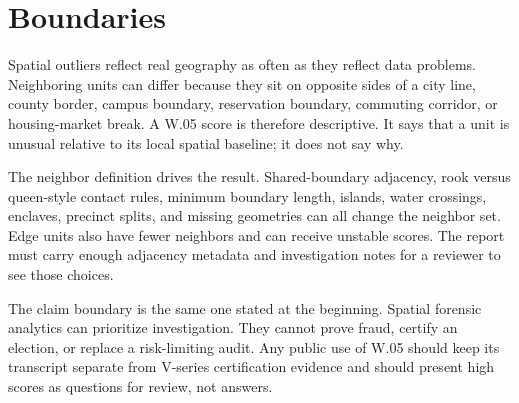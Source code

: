 \section{Boundaries}

Spatial outliers reflect real geography as often as they reflect data problems.
Neighboring units can differ because they sit on opposite sides of a city line,
county border, campus boundary, reservation boundary, commuting corridor, or
housing-market break. A W.05 score is therefore descriptive. It says that a unit
is unusual relative to its local spatial baseline; it does not say why.

The neighbor definition drives the result. Shared-boundary adjacency, rook
versus queen-style contact rules, minimum boundary length, islands, water
crossings, enclaves, precinct splits, and missing geometries can all change the
neighbor set. Edge units also have fewer neighbors and can receive unstable
scores. The report must carry enough adjacency metadata and investigation notes
for a reviewer to see those choices.

The claim boundary is the same one stated at the beginning. Spatial forensic
analytics can prioritize investigation. They cannot prove fraud, certify an
election, or replace a risk-limiting audit. Any public use of W.05 should keep
its transcript separate from V-series certification evidence and should present
high scores as questions for review, not answers.
